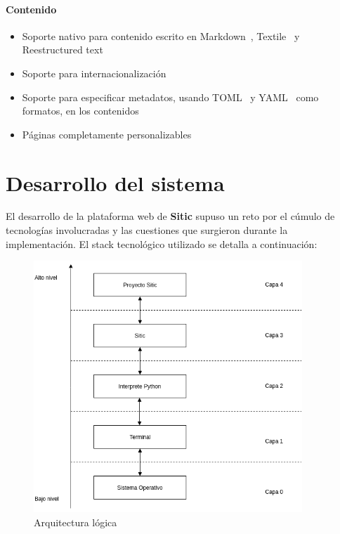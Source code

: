 \documentclass[a4paper,12pt]{article}
\begin{document}
\paragraph{Contenido}

\begin{itemize}
\item Soporte nativo para contenido escrito en Markdown~\cite{markdown}, Textile~\cite{textile} y Reestructured text~\cite{restructuredtext}
\item Soporte para internacionalización
\item Soporte para especificar metadatos, usando TOML~\cite{toml} y YAML~\cite{yaml} como formatos, en los contenidos
\item Páginas completamente personalizables
\end{itemize}


\section{Desarrollo del sistema}

El desarrollo de la plataforma web de \textbf{Sitic} supuso un reto por el cúmulo de tecnologías
involucradas y las cuestiones que surgieron durante la implementación. El stack tecnológico
utilizado se detalla a continuación:

\begin{figure}[htbp]
    \centering
    \includegraphics[width=0.9\textwidth]{img/arquitectura_logica}
    \caption{Arquitectura lógica}
    \label{fig:arquitectura-logica}
\end{figure}
\end{document}
